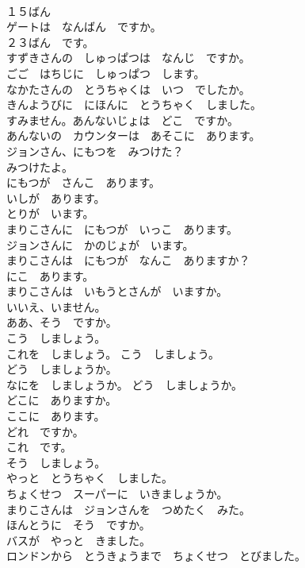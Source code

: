 \documentclass[8pt]{extreport}
\begin{document}
\begin{CJK}{UTF8}{min}
\\	１５ばん	
\\	ゲートは　なんばん　ですか。	
\\	２３ばん　です。	
\\	すずきさんの　しゅっぱつは　なんじ　ですか。	
\\	ごご　はちじに　しゅっぱつ　します。	
\\	なかたさんの　とうちゃくは　いつ　でしたか。	
\\	きんようびに　にほんに　とうちゃく　しました。	
\\	すみません。あんないじょは　どこ　ですか。	
\\	あんないの　カウンターは　あそこに　あります。	
\\	ジョンさん、にもつを　みつけた？	
\\	みつけたよ。	
\\	にもつが　さんこ　あります。	
\\	いしが　あります。	
\\	とりが　います。	
\\	まりこさんに　にもつが　いっこ　あります。	
\\	ジョンさんに　かのじょが　います。	
\\	まりこさんは　にもつが　なんこ　ありますか？	
\\	にこ　あります。	
\\	まりこさんは　いもうとさんが　いますか。	
\\	いいえ、いません。	
\\	ああ、そう　ですか。	
\\	こう　しましょう。	
\\	これを　しましょう。 こう　しましょう。	
\\	どう　しましょうか。	
\\	なにを　しましょうか。 どう　しましょうか。	
\\	どこに　ありますか。	
\\	ここに　あります。	
\\	どれ　ですか。	
\\	これ　です。	
\\	そう　しましょう。	
\\	やっと　とうちゃく　しました。	
\\	ちょくせつ　スーパーに　いきましょうか。	
\\	まりこさんは　ジョンさんを　つめたく　みた。	
\\	ほんとうに　そう　ですか。	
\\	バスが　やっと　きました。	
\\	ロンドンから　とうきょうまで　ちょくせつ　とびました。	

\end{CJK}
\end{document}

